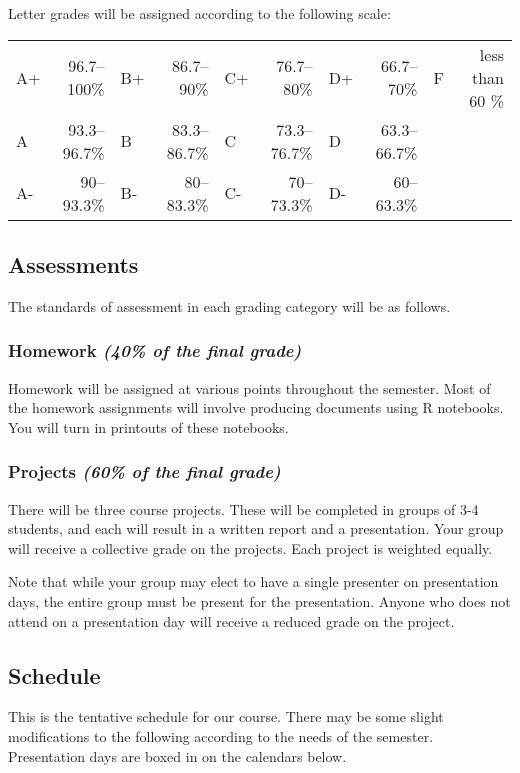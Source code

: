 \documentclass[11pt]{article}
\begin{document}
\vspace{0.25in}

Letter grades will be assigned according to the following scale:

\begin{tabular}{|lr|lr|lr|lr|lr|}
    \hline
    A+ & 96.7--100\% & B+ & 86.7--90\% & C+ & 76.7--80\% & D+ & 66.7--70\% & F & less than 60 \% \\
    A  & 93.3--96.7\% & B & 83.3--86.7\% & C & 73.3--76.7\% & D & 63.3--66.7\% & & \\
    A- & 90--93.3\% & B- & 80--83.3\% & C- & 70--73.3\% & D- & 60--63.3\% & & \\
    \hline
\end{tabular}

\subsection*{Assessments}
The standards of assessment in each grading category will be as
follows.

\subsubsection*{Homework {\em (40\% of the final grade)}}
Homework will be assigned at various points throughout the semester.
Most of the homework assignments will involve producing documents
using R notebooks.  You will turn in printouts of these notebooks.

\subsubsection*{Projects {\em (60\% of the final grade)}}
There will be three course projects.  These will be completed in
groups of 3-4 students, and each will result in a written report and
a presentation.  Your group will receive a collective grade on the
projects.  Each project is weighted equally.

Note that while your group may elect to have a single presenter on
presentation days, the entire group must be present for the
presentation.  Anyone who does not attend on a presentation day will
receive a reduced grade on the project.  



\subsection*{Schedule}
This is the tentative schedule for our course.  There may be some
slight modifications to the following according to the needs of the
semester.  Presentation days are boxed in on the calendars below.
\end{document}
